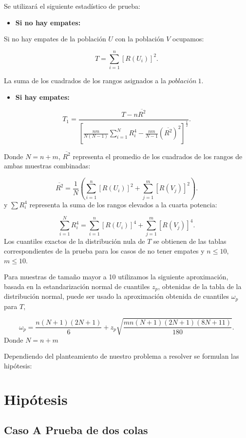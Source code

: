\documentclass[
  a4paper,
  oneside,
  openany]{book}
\providecommand{\tightlist}{%
  \setlength{\itemsep}{0pt}\setlength{\parskip}{0pt}}
\begin{document}
Se utilizará el siguiente estadístico de prueba:

\begin{itemize}
\tightlist
\item
  \textbf{Si no hay empates:}
\end{itemize}

Si no hay empates de la población \(U\) con la población \(V\) ocupamos:

\[T=\sum_{i=1}^{n}[R(U_{i})]^2.\]

La suma de los cuadrados de los rangos asignados a la \(población \ 1\).

\begin{itemize}
\tightlist
\item
  \textbf{Si hay empates:}
\end{itemize}

\[T_{1} = \frac{T-n\overline{R^2}}{\left[\frac{nm}{N(N-1)}\sum_{i=1}^{N}R_{i}^4-\frac{nm}{N-1}(\overline{R^2})^2\right]^\frac{1}{2}}.\]

Donde \(N= n+m\), \(\overline{R^2}\) representa el promedio de los cuadrados de los rangos de ambas muestras combinadas:

\[\overline{R^2}= \frac{1}{N}\left(\sum_{i=1}^{n}[R(U_{i})]^2+\sum_{j=1}^{m}[R(V_{j})]^2\right).\]
y \(\sum R_{i}^4\) representa la suma de los rangos elevados a la cuarta potencia:

\[ \sum_{i=1}^{N}R_{i}^4= \sum_{i=1}^{n}[R(U_{i})]^4+\sum_{j=1}^{m}[R(V_{j})]^4.\]
Los cuantiles exactos de la distribución nula de \(T\) se obtienen de las tablas correspondientes de la prueba para los casos de no tener empates y \(n \leq 10\), \(m \leq 10\).

Para muestras de tamaño mayor a 10 utilizamos la siguiente aproximación, basada en la estandarización normal de cuantiles \(z_p\), obtenidas de la tabla de la distribución normal, puede ser usado la aproximación obtenida de cuantiles \(\omega_p\) para \(T\),

\[\omega_p= \frac{n(N+1)(2N+1)}{6}+z_{p}\sqrt{\frac{mn(N+1)(2N+1)(8N+11)}{180}}.\]
Donde \(N= n+m\)

Dependiendo del planteamiento de nuestro problema a resolver se formulan las hipótesis:

\hypertarget{hipuxf3tesis-7}{%
\section{Hipótesis}\label{hipuxf3tesis-7}}

\hypertarget{caso-a-prueba-de-dos-colas-6}{%
\subsection*{Caso A Prueba de dos colas}\label{caso-a-prueba-de-dos-colas-6}}
\end{document}
